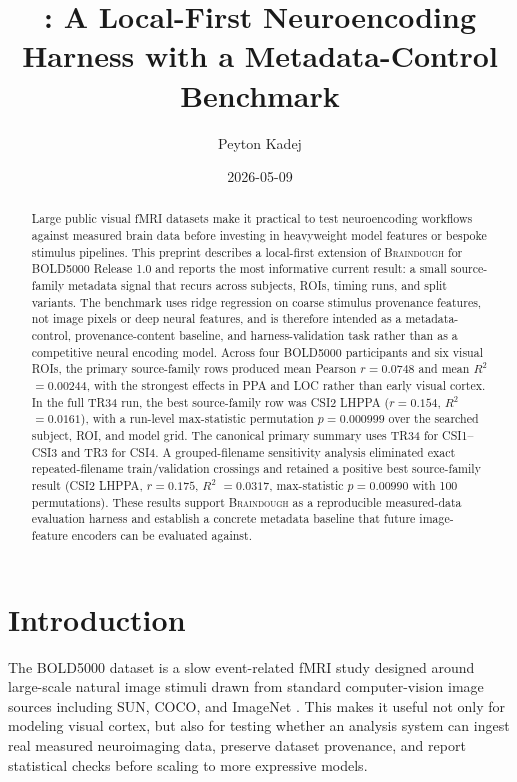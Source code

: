 \documentclass[11pt]{article}
\title{\braindough: A Local-First Neuroencoding Harness with a \boldfive{} Metadata-Control Benchmark}
\author{Peyton Kadej}
\date{2026-05-09}
\newcommand{\braindough}{\textsc{Braindough}}
\newcommand{\boldfive}{BOLD5000}
\newcommand{\rsq}{$R^2$}
\begin{document}
\maketitle

\begin{abstract}
Large public visual fMRI datasets make it practical to test neuroencoding
workflows against measured brain data before investing in heavyweight model
features or bespoke stimulus pipelines. This preprint describes a local-first
extension of \braindough{} for \boldfive{} Release 1.0 and reports the most
informative current result: a small source-family metadata signal that recurs
across subjects, ROIs, timing runs, and split variants. The benchmark uses ridge
regression on coarse stimulus provenance features, not image pixels or deep
neural features, and is therefore intended as a metadata-control,
provenance-content baseline, and harness-validation task rather than as a
competitive neural encoding model. Across four \boldfive{} participants and six
visual ROIs, the primary source-family rows produced mean Pearson $r=0.0748$
and mean \rsq{} $=0.00244$, with the strongest effects in PPA and LOC rather
than early visual cortex. In the full TR34 run, the best source-family row was
CSI2 LHPPA ($r=0.154$, \rsq{} $=0.0161$), with a run-level max-statistic
permutation $p=0.000999$ over the searched subject, ROI, and model grid. The
canonical primary summary uses TR34 for CSI1--CSI3 and TR3 for CSI4. A
grouped-filename sensitivity analysis eliminated exact repeated-filename
train/validation crossings and retained a positive best source-family result
(CSI2 LHPPA, $r=0.175$, \rsq{} $=0.0317$, max-statistic $p=0.00990$ with 100
permutations). These results support \braindough{} as a reproducible
measured-data evaluation harness and establish a concrete metadata baseline that
future image-feature encoders can be evaluated against.
\end{abstract}

\section{Introduction}

The \boldfive{} dataset is a slow event-related fMRI study designed around
large-scale natural image stimuli drawn from standard computer-vision image
sources including SUN, COCO, and ImageNet \cite{chang2019bold5000}. This makes
it useful not only for modeling visual cortex, but also for testing whether an
analysis system can ingest real measured neuroimaging data, preserve dataset
provenance, and report statistical checks before scaling to more expressive
models.
\end{document}
